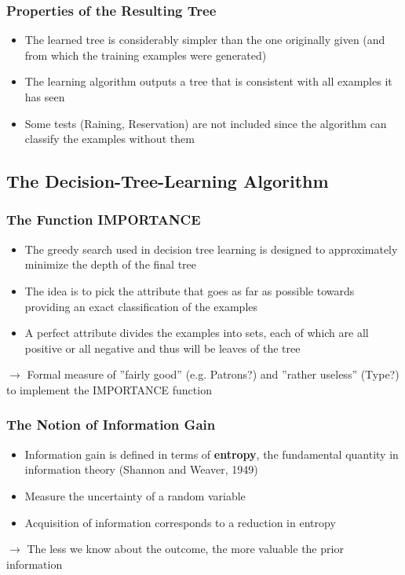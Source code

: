 \documentclass[conference, a4paper]{styles/acmsiggraph}
\begin{document}
        \subsubsection{Properties of the Resulting Tree}
            \begin{itemize}
                \item The learned tree is considerably simpler than the one originally given (and from which the training examples were generated)
                \item The learning algorithm outputs a tree that is consistent with all examples it has seen
                \item Some tests (Raining, Reservation) are not included since the algorithm can classify the examples without them
            \end{itemize}
        
        \subsection{The Decision-Tree-Learning Algorithm}
    
    
    
    
    
        \subsubsection{The Function IMPORTANCE}
            \begin{itemize}
                \item The greedy search used in decision tree learning is designed to approximately minimize the depth of the final tree
                \item The idea is to pick the attribute that goes as far as possible towards providing an exact classification of the examples
                \item A perfect attribute divides the examples into sets, each of which are all positive or all negative and thus will be leaves of the tree
            \end{itemize}
            $\rightarrow$ Formal measure of ''fairly good'' (e.g. Patrons?) and ''rather useless'' (Type?) to implement the IMPORTANCE function
        
        \subsubsection{The Notion of Information Gain}
            \begin{itemize}
                \item Information gain is defined in terms of \textbf{entropy}, the fundamental quantity in information theory (Shannon and Weaver, 1949)
                \item Measure the uncertainty of a random variable
                \item Acquisition of information corresponds to a reduction in entropy
            \end{itemize}
            $\rightarrow$ The less we know about the outcome, the more valuable the prior information
        
\end{document}
